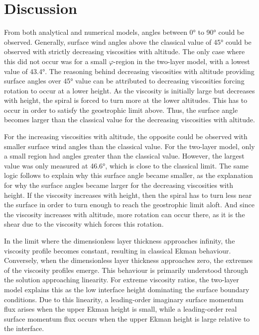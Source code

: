 \section{Discussion}

From both analytical and numerical models, angles between \ang{0} to \ang{90} could be observed. Generally, surface wind angles above the classical value of \ang{45} could be observed with strictly decreasing viscosities with altitude. The only case where this did not occur was for a small $\varphi$-region in the two-layer model, with a lowest value of \ang{43.4}. The reasoning behind decreasing viscosities with altitude providing surface angles over \ang{45} value can be attributed to decreasing viscosities forcing rotation to occur at a lower height. As the viscosity is initially large but decreases with height, the spiral is forced to turn more at the lower altitudes. This has to occur in order to satisfy the geostrophic limit above. Thus, the surface angle becomes larger than the classical value for the decreasing viscosities with altitude.

For the increasing viscosities with altitude, the opposite could be observed with smaller surface wind angles than the classical value. For the two-layer model, only a small region had angles greater than the classical value. However, the largest value was only measured at \ang{46.6}, which is close to the classical limit. The same logic follows to explain why this surface angle became smaller, as the explanation for why the surface angles became larger for the decreasing viscosities with height. If the viscosity increases with height, then the spiral has to turn less near the surface in order to turn enough to reach the geostrophic limit aloft. And since the viscosity increases with altitude, more rotation can occur there, as it is the shear due to the viscosity which forces this rotation. 

In the limit where the dimensionless layer thickness approaches infinity, the viscosity profile becomes constant, resulting in classical Ekman behaviour. Conversely, when the dimensionless layer thickness approaches zero, the extremes of the viscosity profiles emerge. This behaviour is primarily understood through the solution approaching linearity. For extreme viscosity ratios, the two-layer model explains this as the low interface height dominating the surface boundary conditions. Due to this linearity, a leading-order imaginary surface momentum flux arises when the upper Ekman height is small, while a leading-order real surface momentum flux occurs when the upper Ekman height is large relative to the interface.

